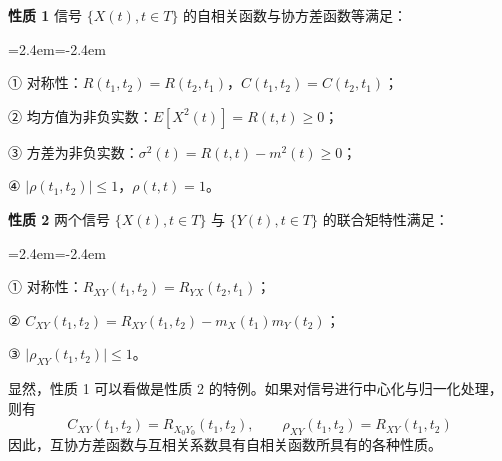 \documentclass[11pt,openany,UTF8]{ctexbook}
\newcommand{\E}{E}                                 %
\newcommand{\thm}[1]{\par\medskip\noindent\textbf{#1}\quad}
\newenvironment{citemize}
  {\begin{list}{}{\leftmargin=2.4em\itemindent=-2.4em\itemsep=1pt\topsep=3pt\parsep=0pt}}
  {\end{list}}
\begin{document}
\thm{性质 1} 信号 $\{X(t),t\in T\}$ 的自相关函数与协方差函数等满足\nobreak：
\begin{citemize}
\item ① 对称性\nobreak：$R(t_1,t_2)=R(t_2,t_1)$\nobreak，$C(t_1,t_2)=C(t_2,t_1)$\nobreak；
\item ② 均方值为非负实数\nobreak：$\E[X^2(t)]=R(t,t)\geqslant 0$\nobreak；
\item ③ 方差为非负实数\nobreak：$\sigma^2(t)=R(t,t)-m^2(t)\geqslant 0$\nobreak；
\item ④ $\lvert\rho(t_1,t_2)\rvert\leqslant 1$\nobreak，$\rho(t,t)=1$\nobreak。
\end{citemize}

\thm{性质 2} 两个信号 $\{X(t),t\in T\}$ 与 $\{Y(t),t\in T\}$ 的联合矩特性满足\nobreak：
\begin{citemize}
\item ① 对称性\nobreak：$R_{XY}(t_1,t_2)=R_{YX}(t_2,t_1)$\nobreak；
\item ② $C_{XY}(t_1,t_2)=R_{XY}(t_1,t_2)-m_X(t_1)m_Y(t_2)$\nobreak；
\item ③ $\lvert\rho_{XY}(t_1,t_2)\rvert\leqslant 1$\nobreak。
\end{citemize}

显然\nobreak，性质 1 可以看做是性质 2 的特例\nobreak。如果对信号进行中心化与归一化处理\nobreak，则有
\[
C_{XY}(t_1,t_2)=R_{X_0Y_0}(t_1,t_2),\qquad \rho_{XY}(t_1,t_2)=R_{XY}(t_1,t_2)
\]
因此\nobreak，互协方差函数与互相关系数具有自相关函数所具有的各种性质\nobreak。
\end{document}
